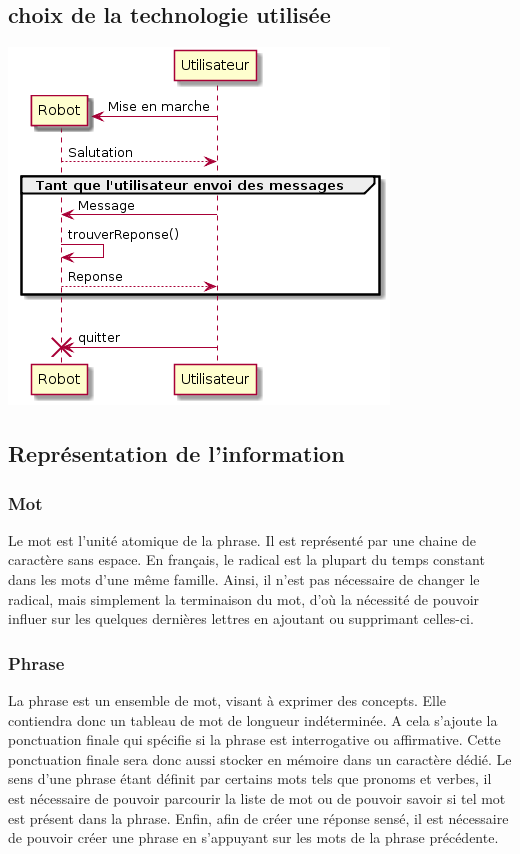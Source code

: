 \subsection{choix de la technologie utilisée}
\includegraphics[scale=0.5]{diagrammeDeSequence.png}
\subsection{Représentation de l'information}
\subsubsection{Mot}
Le mot est l'unité atomique de la phrase. Il est représenté par une chaine de caractère sans espace. En français, le radical est la plupart du temps constant dans les mots d'une même famille. Ainsi, il n'est pas nécessaire de changer le radical, mais simplement la terminaison du mot, d'où la nécessité de pouvoir influer sur les quelques dernières lettres en ajoutant ou supprimant celles-ci.
\subsubsection{Phrase}
La phrase est un ensemble de mot, visant à exprimer des concepts. Elle contiendra donc un tableau de mot de longueur indéterminée. A cela s'ajoute la ponctuation finale qui spécifie si la phrase est interrogative ou affirmative. Cette ponctuation finale sera donc aussi stocker en mémoire dans un caractère dédié. Le sens d'une phrase étant définit par certains mots tels que pronoms et verbes, il est nécessaire de pouvoir parcourir la liste de mot ou de pouvoir savoir si tel mot est présent dans la phrase.
Enfin, afin de créer une réponse sensé, il est nécessaire de pouvoir créer une phrase en s'appuyant sur les mots de la phrase précédente.
